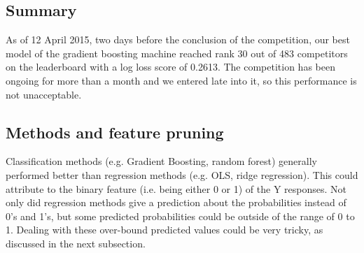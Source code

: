 \documentclass{article}\usepackage[]{graphicx}\usepackage[]{color}
\begin{document}
                                                                                                                                                                                                                                                                                                                                                                                                                                                                                                                                                                                                \subsection{Summary}
                                                                                                                                                                                                                                                                                                                                                                                                                                                                                                                                                                                                As of 12 April 2015, two days before the conclusion of the competition, our best model of the gradient boosting machine reached rank 30 out of 483 competitors on the leaderboard with a log loss score of 0.2613. The competition has been ongoing for more than a month and we entered late into it, so this performance is not unacceptable.
                                                                                                                                                                                                                                                                                                                                                                                                                                                                                                                                                                                                
\subsection{Methods and feature pruning}

Classification methods (e.g. Gradient Boosting, random forest) generally performed better than regression methods (e.g. OLS, ridge regression). This could attribute to the binary feature (i.e. being either 0 or 1) of the Y responses. Not only did regression methods give a prediction about the probabilities instead of 0's and 1's, but some predicted probabilities could be outside of the range of 0 to 1. Dealing with these over-bound predicted values could be very tricky, as discussed in the next subsection.
\end{document}
